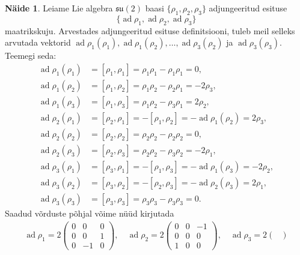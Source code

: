\documentclass[12pt,a4paper,oneside]{article}
\theoremstyle{plain}
\theoremstyle{definition}
\newtheorem{naide}{Näide}[section]
\numberwithin{equation}{section}
\def\su2{{\mathfrak{ su}\left(2\right)}}
\DeclareMathOperator{\ad}{ad}
\begin{document}
\begin{naide}
Leiame Lie algebra $\su2$ baasi $\{\rho_1, \rho_2, \rho_3\}$ 
adjungeeritud esituse
\[\{\ad \rho_1, \ad \rho_2, \ad \rho_3\}\]
maatrikskuju. Arvestades adjungeeritud esituse definitsiooni, tuleb 
meil selleks arvutada vektorid $\ad \rho_1 \left(\rho_1\right), 
\ad \rho_1 \left(\rho_2\right), \ldots, 
\ad \rho_3 \left(\rho_2\right)$ ja $\ad \rho_3 \left(\rho_3\right)$. 
Teemegi seda:
\begin{align*}
\ad \rho_1 \left(\rho_1\right) &= \left[\rho_1, \rho_1\right] = 
	\rho_1 \rho_1 - \rho_1 \rho_1 = 0, \\
\ad \rho_1 \left(\rho_2\right) &= \left[\rho_1, \rho_2\right] = 
	\rho_1 \rho_2 - \rho_2 \rho_1 = -2\rho_3, \\
\ad \rho_1 \left(\rho_3\right) &= \left[\rho_1, \rho_3\right] = 
	\rho_1 \rho_2 - \rho_3 \rho_1 = 2\rho_2, \\
\ad \rho_2 \left(\rho_1\right) &= \left[\rho_2, \rho_1\right] = 
	-\left[\rho_1, \rho_2\right] = - \ad \rho_1 \left(\rho_2\right) 
	= 2\rho_3, \\
\ad \rho_2 \left(\rho_2\right) &= \left[\rho_2, \rho_2\right] = 
	\rho_2 \rho_2 - \rho_2 \rho_2 = 0, \\
\ad \rho_2 \left(\rho_3\right) &= \left[\rho_2, \rho_3\right] = 
	\rho_2 \rho_2 - \rho_3 \rho_2 = -2\rho_1, \\
\ad \rho_3 \left(\rho_1\right) &= \left[\rho_3, \rho_1\right] = 
	-\left[\rho_1, \rho_3\right] = - 
	\ad \rho_1 \left(\rho_3\right) = -2\rho_2, \\
\ad \rho_3 \left(\rho_2\right) &= \left[\rho_3, \rho_2\right] = 
	-\left[\rho_2, \rho_3\right] = 
	-\ad \rho_2 \left(\rho_3\right) = 2\rho_1, \\
\ad \rho_3 \left(\rho_3\right) &= \left[\rho_3, \rho_3\right] = 
	\rho_3 \rho_3 - \rho_3 \rho_3 = 0.
\end{align*}
Saadud võrduste põhjal võime nüüd kirjutada
\begin{align*}
\ad \rho_1 = 2\begin{pmatrix}
0 & 0 & 0 \\
0 & 0 & 1 \\
0 & -1 & 0
\end{pmatrix},\quad
\ad \rho_2 = 2\begin{pmatrix}
0 & 0 & -1 \\
0 & 0 & 0 \\
1 & 0 & 0
\end{pmatrix},\quad
\ad \rho_3 = 2\begin{pmatrix}

\end{pmatrix}
\end{align*}
\end{naide}
\end{document}
